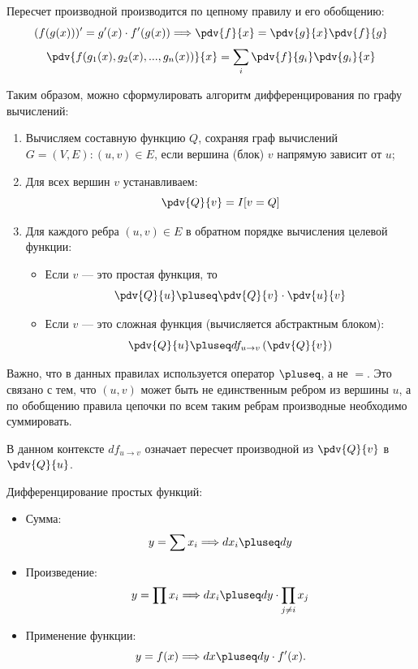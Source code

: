Пересчет производной производится по цепному правилу и его обобщению:
\[
    (f(g(x)))'=g'(x)\cdot f'(g(x)) \Longrightarrow \pdv{f}{x} = \pdv{g}{x} \pdv{f}{g}
\]
\[
    \pdv{f(g_1(x), g_2(x),...,g_n(x))}{x} = \sum_i \pdv{f}{g_i}\pdv{g_i}{x}
\]

Таким образом, можно сформулировать алгоритм дифференцирования по графу вычислений:
\begin{enumerate}
    \item Вычисляем составную функцию $Q$, сохраняя граф вычислений $G=(V, E) : (u, v) \in E$, если вершина (блок) $v$ напрямую зависит от $u$;
    \item Для всех вершин $v$ устанавливаем:
    \[
        \pdv{Q}{v}=I[v=Q]
    \]
    \item Для каждого ребра $(u, v)\in E$ в обратном порядке вычисления целевой функции:
    \begin{itemize}
        \item Если $v$ --- это простая функция, то
        \[
            \pdv{Q}{u} \pluseq \pdv{Q}{v} \cdot \pdv{u}{v}
        \]
        \item Если $v$ --- это сложная функция (вычисляется абстрактным блоком):
        \[
            \pdv{Q}{u} \pluseq df_{u\to v}\left(\pdv{Q}{v}\right)
        \]
    \end{itemize}
\end{enumerate}

\begin{remark}
    Важно, что в данных правилах используется оператор $\pluseq$, а не $=$. Это связано с тем, что $(u, v)$ может быть не единственным ребром из вершины $u$, а по обобщению правила цепочки по всем таким ребрам производные необходимо суммировать.
\end{remark}

\begin{remark}
    В данном контексте $df_{u\to v}$ означает пересчет производной из $\pdv{Q}{v}$ в $\pdv{Q}{u}$.
\end{remark}

\begin{example}
    Дифференцирование простых функций:
    \begin{itemize}
        \item Сумма:
        \[
            y = \sum x_i \Longrightarrow dx_i \pluseq dy
        \]
        \item Произведение:
        \[
            y = \prod x_i \Longrightarrow dx_i \pluseq  dy \cdot \prod_{j\ne i} x_j
        \]
        \item Применение функции:
        \[
            y = f(x) \Longrightarrow dx \pluseq dy \cdot f'(x).
        \]
    \end{itemize}
\end{example}

